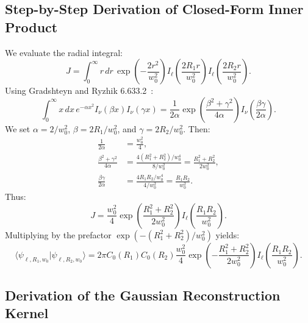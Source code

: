 \documentclass[11pt,a4paper]{article}
\begin{document}
\subsection{Step-by-Step Derivation of Closed-Form Inner Product}

We evaluate the radial integral:
\begin{equation}
J = \int_0^\infty r \, dr \, \exp\left( - \frac{2 r^2}{w_0^2} \right) I_\ell\left( \frac{2 R_1 r}{w_0^2} \right) I_\ell\left( \frac{2 R_2 r}{w_0^2} \right).
\label{eq:app_j_integral}
\end{equation}
Using Gradshteyn and Ryzhik 6.633.2~\cite{Gradshteyn2014}:
\begin{equation}
\int_0^\infty x \, dx \, e^{-\alpha x^2} I_\nu(\beta x) I_\nu(\gamma x) = \frac{1}{2\alpha} \exp\left( \frac{\beta^2 + \gamma^2}{4\alpha} \right) I_\nu\left( \frac{\beta \gamma}{2\alpha} \right).
\label{eq:app_weber_ref}
\end{equation}
We set $\alpha = 2 / w_0^2$, $\beta = 2 R_1 / w_0^2$, and $\gamma = 2 R_2 / w_0^2$. Then:
\begin{align}
\frac{1}{2\alpha} &= \frac{w_0^2}{4}, \\
\frac{\beta^2 + \gamma^2}{4\alpha} &= \frac{4(R_1^2 + R_2^2) / w_0^4}{8 / w_0^2} = \frac{R_1^2 + R_2^2}{2 w_0^2}, \\
\frac{\beta \gamma}{2\alpha} &= \frac{4 R_1 R_2 / w_0^4}{4 / w_0^2} = \frac{R_1 R_2}{w_0^2}.
\end{align}
Thus:
\begin{equation}
J = \frac{w_0^2}{4} \exp\left( \frac{R_1^2 + R_2^2}{2 w_0^2} \right) I_\ell\left( \frac{R_1 R_2}{w_0^2} \right).
\label{eq:app_j_result}
\end{equation}
Multiplying by the prefactor $\exp(-(R_1^2 + R_2^2)/w_0^2)$ yields:
\begin{equation}
\langle \psi_{\ell, R_1, w_0} | \psi_{\ell, R_2, w_0} \rangle = 2\pi C_0(R_1) C_0(R_2) \frac{w_0^2}{4} \exp\left( - \frac{R_1^2 + R_2^2}{2 w_0^2} \right) I_\ell\left( \frac{R_1 R_2}{w_0^2} \right).
\label{eq:app_exact_inner_prod}
\end{equation}

\subsection{Derivation of the Gaussian Reconstruction Kernel}
\end{document}
